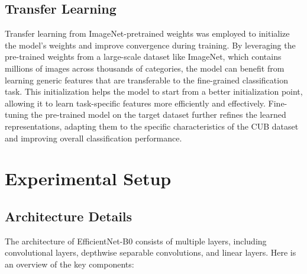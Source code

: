 \documentclass[12pt, a4paper, twoside]{article}
\begin{document}
		\subsection{Transfer Learning}
			Transfer learning\cite{code} from ImageNet-pretrained weights was employed to initialize the model's weights and improve convergence during training. By leveraging the pre-trained weights from a large-scale dataset like ImageNet, which contains millions of images across thousands of categories, the model can benefit from learning generic features that are transferable to the fine-grained classification task. This initialization helps the model to start from a better initialization point, allowing it to learn task-specific features more efficiently and effectively. Fine-tuning the pre-trained model on the target dataset further refines the learned representations, adapting them to the specific characteristics of the CUB dataset and improving overall classification performance.
		
	\section{Experimental Setup}
		\subsection{Architecture Details}
			The architecture of EfficientNet-B0\cite{paper} consists of multiple layers, including convolutional layers, depthwise separable convolutions, and linear layers. Here is an overview of the key components:
			
\end{document}
